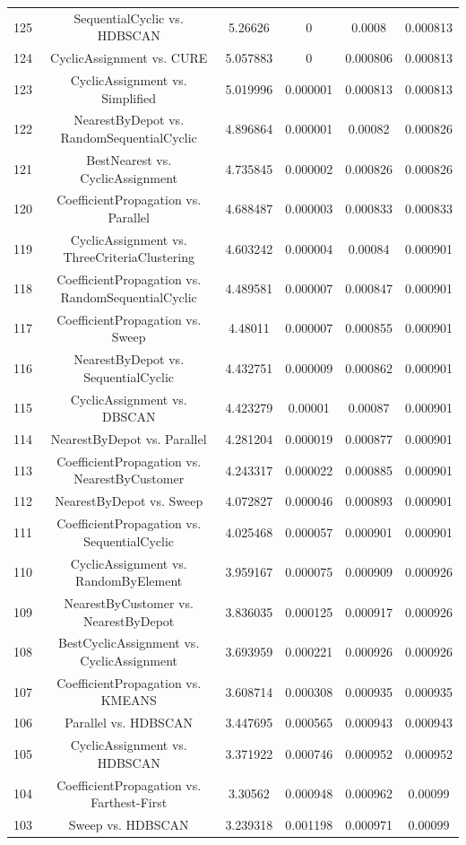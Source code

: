 \documentclass[a4paper,10pt]{article}
\begin{document}
\begin{landscape}
\begin{table}[!htp]
\begin{tabular}{cccccc}
125&SequentialCyclic vs. HDBSCAN&5.26626&0&0.0008&0.000813\\
124&CyclicAssignment vs. CURE&5.057883&0&0.000806&0.000813\\
123&CyclicAssignment vs. Simplified&5.019996&0.000001&0.000813&0.000813\\
122&NearestByDepot vs. RandomSequentialCyclic&4.896864&0.000001&0.00082&0.000826\\
121&BestNearest vs. CyclicAssignment&4.735845&0.000002&0.000826&0.000826\\
120&CoefficientPropagation vs. Parallel&4.688487&0.000003&0.000833&0.000833\\
119&CyclicAssignment vs. ThreeCriteriaClustering&4.603242&0.000004&0.00084&0.000901\\
118&CoefficientPropagation vs. RandomSequentialCyclic&4.489581&0.000007&0.000847&0.000901\\
117&CoefficientPropagation vs. Sweep&4.48011&0.000007&0.000855&0.000901\\
116&NearestByDepot vs. SequentialCyclic&4.432751&0.000009&0.000862&0.000901\\
115&CyclicAssignment vs. DBSCAN&4.423279&0.00001&0.00087&0.000901\\
114&NearestByDepot vs. Parallel&4.281204&0.000019&0.000877&0.000901\\
113&CoefficientPropagation vs. NearestByCustomer&4.243317&0.000022&0.000885&0.000901\\
112&NearestByDepot vs. Sweep&4.072827&0.000046&0.000893&0.000901\\
111&CoefficientPropagation vs. SequentialCyclic&4.025468&0.000057&0.000901&0.000901\\
110&CyclicAssignment vs. RandomByElement&3.959167&0.000075&0.000909&0.000926\\
109&NearestByCustomer vs. NearestByDepot&3.836035&0.000125&0.000917&0.000926\\
108&BestCyclicAssignment vs. CyclicAssignment&3.693959&0.000221&0.000926&0.000926\\
107&CoefficientPropagation vs. KMEANS&3.608714&0.000308&0.000935&0.000935\\
106&Parallel vs. HDBSCAN&3.447695&0.000565&0.000943&0.000943\\
105&CyclicAssignment vs. HDBSCAN&3.371922&0.000746&0.000952&0.000952\\
104&CoefficientPropagation vs. Farthest-First&3.30562&0.000948&0.000962&0.00099\\
103&Sweep vs. HDBSCAN&3.239318&0.001198&0.000971&0.00099\\

\end{tabular}
\end{table}
\end{landscape}
\end{document}
